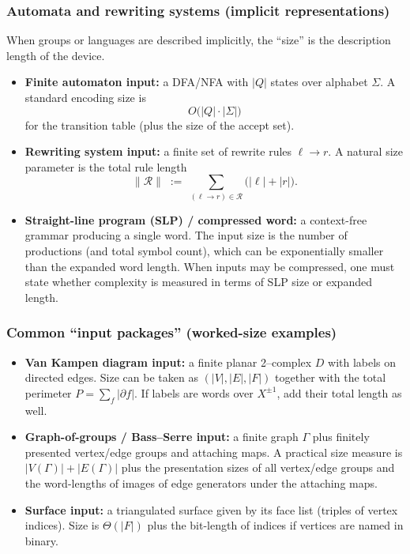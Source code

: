 \documentclass[11pt]{article}
\theoremstyle{definition}
\theoremstyle{plain}
\theoremstyle{remark}
\begin{document}
\subsubsection*{Automata and rewriting systems (implicit representations)}
When groups or languages are described implicitly, the ``size'' is the description length of the device.
\begin{itemize}[leftmargin=2em]
\item \textbf{Finite automaton input:} a DFA/NFA with $|Q|$ states over alphabet $\Sigma$.
A standard encoding size is
\[
O\bigl(|Q|\cdot|\Sigma|\bigr)
\]
for the transition table (plus the size of the accept set).
\item \textbf{Rewriting system input:} a finite set of rewrite rules $\ell\to r$.
A natural size parameter is the total rule length
\[
\|\mathcal R\|\;:=\;\sum_{(\ell\to r)\in\mathcal R}\bigl(|\ell|+|r|\bigr).
\]
\item \textbf{Straight-line program (SLP) / compressed word:} a context-free grammar producing a single word.
The input size is the number of productions (and total symbol count), which can be exponentially smaller than the expanded word length.
When inputs may be compressed, one must state whether complexity is measured in terms of SLP size or expanded length.
\end{itemize}

\subsubsection*{Common ``input packages'' (worked-size examples)}
\begin{itemize}[leftmargin=2em]
\item \textbf{Van Kampen diagram input:} a finite planar 2--complex $D$ with labels on directed edges.
Size can be taken as $(|V|,|E|,|F|)$ together with the total perimeter $P=\sum_{f}|\partial f|$.
If labels are words over $X^{\pm1}$, add their total length as well.

\item \textbf{Graph-of-groups / Bass--Serre input:} a finite graph $\Gamma$ plus finitely presented vertex/edge groups and attaching maps.
A practical size measure is $|V(\Gamma)|+|E(\Gamma)|$ plus the presentation sizes of all vertex/edge groups and the word-lengths
of images of edge generators under the attaching maps.

\item \textbf{Surface input:} a triangulated surface given by its face list (triples of vertex indices).
Size is $\Theta(|F|)$ plus the bit-length of indices if vertices are named in binary.
\end{itemize}
\end{document}
